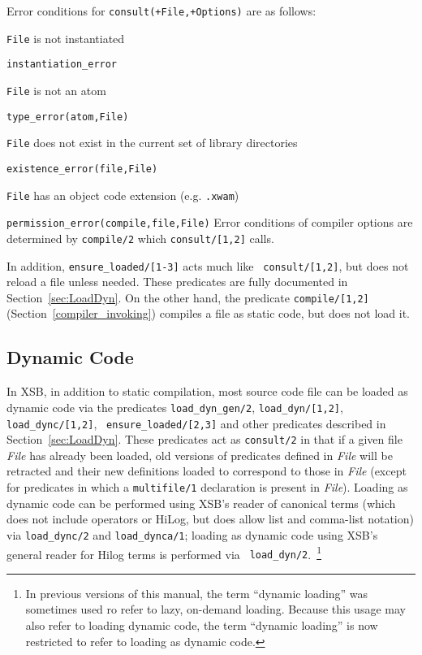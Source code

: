\begin{description}
Error conditions for {\tt consult(+File,+Options)} are as follows: 
\bi
\item 	{\tt File} is not instantiated
\bi
\item 	{\tt instantiation\_error}
\ei
%
\item 	{\tt File} is not an atom
\bi
\item 	{\tt type\_error(atom,File)}
\ei
\item 	{\tt File} does not exist in the current set of library directories
\bi
\item 	{\tt existence\_error(file,File)}
\ei
%
\item 	{\tt File} has an object code extension (e.g. {\tt .xwam})
\bi
\item 	{\tt permission\_error(compile,file,File)}
\ei
%
\ei
Error conditions of compiler options are determined by {\tt compile/2}
which {\tt consult/[1,2]} calls.
\end{description}

In addition, {\tt ensure\_loaded/[1-3]} acts much like {\tt
  consult/[1,2]}, but does not reload a file unless needed.  These
predicates are fully documented in Section~\ref{sec:LoadDyn}.  On the
other hand, the predicate {\tt compile/[1,2]}
(Section~\ref{compiler_invoking}) compiles a file as static code, but
does not load it.

\subsection{Dynamic Code} \label{sec:dynamic-code}
% 
In XSB, in addition to static compilation, most source code file can
be loaded as dynamic code via the predicates {\tt load\_dyn\_gen/2},
{\tt load\_dyn/[1,2]}, {\tt load\_dync/[1,2]}, {\tt
  ensure\_loaded/[2,3]} and other predicates described in
Section~\ref{sec:LoadDyn}.  These predicates act as {\tt consult/2} in
that if a given file {\em File} has already been loaded, old versions
of predicates defined in {\em File} will be retracted and their new
definitions loaded to correspond to those in {\em File} (except for
predicates in which a {\tt multifile/1} declaration is present in {\em
  File}).  Loading as dynamic code can be performed using XSB's reader
of canonical terms (which does not include operators or HiLog, but
does allow list and comma-list notation) via {\tt load\_dync/2} and
{\tt load\_dynca/1}; loading as dynamic code using XSB's general
reader for Hilog terms is performed via {\tt
  load\_dyn/2}.~\footnote{In previous versions of this manual, the
  term ``dynamic loading'' was sometimes used ro refer to lazy,
  on-demand loading.  Because this usage may also refer to loading
  dynamic code, the term ``dynamic loading'' is now restricted to
  refer to loading as dynamic code.}

